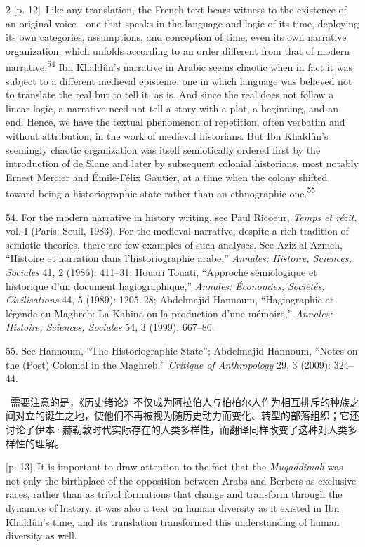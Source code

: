 \documentclass[10pt,a4paper]{article}
\begin{document}
\begin{paracol}{2}
{\scriptsize\color{gray} [p. 12]}\ Like any translation, the French text bears witness to the existence of an original voice—one that speaks in the language and logic of its time, deploying its own categories, assumptions, and conception of time, even its own narrative organization, which unfolds according to an order different from that of modern narrative.\nobreak\textsuperscript{54} Ibn Khaldûn’s narrative in Arabic seems chaotic when in fact it was subject to a different medieval episteme, one in which language was believed not to translate the real but to tell it, as is. And since the real does not follow a linear logic, a narrative need not tell a story with a plot, a beginning, and an end. Hence, we have the textual phenomenon of repetition, often verbatim and without attribution, in the work of medieval historians. But Ibn Khaldûn’s seemingly chaotic organization was itself semiotically ordered first by the introduction of de Slane and later by subsequent colonial historians, most notably Ernest Mercier and Émile-Félix Gautier, at a time when the colony shifted toward being a historiographic state rather than an ethnographic one.\nobreak\textsuperscript{55}\par{\small 54. For the modern narrative in history writing, see Paul Ricoeur, \textit{Temps et récit}, vol. I (Paris: Seuil, 1983). For the medieval narrative, despite a rich tradition of semiotic theories, there are few examples of such analyses. See Aziz al-Azmeh, “Histoire et narration dans l’historiographie arabe,” \textit{Annales: Histoire, Sciences, Sociales} 41, 2 (1986): 411–31; Houari Touati, “Approche sémiologique et historique d’un document hagiographique,” \textit{Annales: Économies, Sociétés, Civilisations} 44, 5 (1989): 1205–28; Abdelmajid Hannoum, “Hagiographie et légende au Maghreb: La Kahina ou la production d’une mémoire,” \textit{Annales: Histoire, Sciences, Sociales} 54, 3 (1999): 667–86.\par}{\small 55. See Hannoum, “The Historiographic State”; Abdelmajid Hannoum, “Notes on the (Post) Colonial in the Maghreb,” \textit{Critique of Anthropology} 29, 3 (2009): 324–44.\par}
\switchcolumn*
{\scriptsize\color{gray} [p. 13]}\ 需要注意的是，《历史绪论》不仅成为阿拉伯人与柏柏尔人作为相互排斥的种族之间对立的诞生之地，使他们不再被视为随历史动力而变化、转型的部落组织；它还讨论了伊本·赫勒敦时代实际存在的人类多样性，而翻译同样改变了这种对人类多样性的理解。\par
\switchcolumn
{\scriptsize\color{gray} [p. 13]}\ It is important to draw attention to the fact that the \textit{Muqaddimah} was not only the birthplace of the opposition between Arabs and Berbers as exclusive races, rather than as tribal formations that change and transform through the dynamics of history, it was also a text on human diversity as it existed in Ibn Khaldûn’s time, and its translation transformed this understanding of human diversity as well.\par

\end{paracol}
\end{document}

